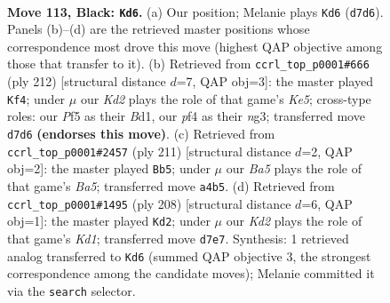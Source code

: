 \documentclass[11pt]{article}
\begin{document}
\clearpage

\begin{figure}[p]\centering
\begin{subfigure}{0.46\textwidth}\centering
\resizebox{\linewidth}{!}{%
\newchessgame
\chessboard[
  setfen={6K1/3k4/8/5p2/b4P2/8/8/8 b - - 41 113},
  showmover=false,
  pgfstyle=straightmove, color=movearrow, markmove={d7-d6}
]}
\caption{}
\end{subfigure}\hfill
\begin{subfigure}{0.46\textwidth}\centering
\resizebox{\linewidth}{!}{%
\newchessgame
\chessboard[
  setfen={7B/4k3/8/4K3/8/6n1/8/3B4 w - - 11 107},
  showmover=false,
  pgfstyle=straightmove, color=movearrow, markmove={e5-f4}
]}
\caption{}
\end{subfigure}
\\[4pt]
\begin{subfigure}{0.46\textwidth}\centering
\resizebox{\linewidth}{!}{%
\newchessgame
\chessboard[
  setfen={4k3/8/p7/P7/b7/8/3K3B/8 b - - 19 106},
  showmover=false,
  pgfstyle=straightmove, color=movearrow, markmove={a4-b5}
]}
\caption{}
\end{subfigure}\hfill
\begin{subfigure}{0.46\textwidth}\centering
\resizebox{\linewidth}{!}{%
\newchessgame
\chessboard[
  setfen={4k3/8/8/4p3/8/5P2/B4b2/3K4 w - - 31 105},
  showmover=false,
  pgfstyle=straightmove, color=movearrow, markmove={d1-d2}
]}
\caption{}
\end{subfigure}
\caption{\textbf{Move 113, Black: \texttt{Kd6}.} (a) Our position; Melanie plays \texttt{Kd6} (\texttt{d7d6}). Panels (b)--(d) are the retrieved master positions whose correspondence most drove this move (highest QAP objective among those that transfer to it). (b) Retrieved from \texttt{ccrl\_top\_p0001\#666} (ply 212) [structural distance $d$=7, QAP obj=3]: the master played \texttt{Kf4}; under $\mu$ our \emph{Kd2} plays the role of that game's \emph{Ke5}; cross-type roles: our \emph{P}f5 as their \emph{B}d1, our \emph{p}f4 as their \emph{n}g3; transferred move \texttt{d7d6} \textbf{(endorses this move)}. (c) Retrieved from \texttt{ccrl\_top\_p0001\#2457} (ply 211) [structural distance $d$=2, QAP obj=2]: the master played \texttt{Bb5}; under $\mu$ our \emph{Ba5} plays the role of that game's \emph{Ba5}; transferred move \texttt{a4b5}. (d) Retrieved from \texttt{ccrl\_top\_p0001\#1495} (ply 208) [structural distance $d$=6, QAP obj=1]: the master played \texttt{Kd2}; under $\mu$ our \emph{Kd2} plays the role of that game's \emph{Kd1}; transferred move \texttt{d7e7}. Synthesis: 1 retrieved analog transferred to \texttt{Kd6} (summed QAP objective 3, the strongest correspondence among the candidate moves); Melanie committed it via the \texttt{search} selector.}
\label{fig:thought-m225}
\end{figure}
\end{document}
